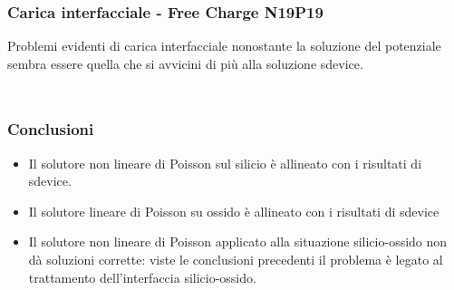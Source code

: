 \begin{frame}
\frametitle{Carica interfacciale - Free Charge N19P19}
Problemi evidenti di carica interfacciale nonostante la soluzione del potenziale sembra essere quella che si avvicini di pi\`u alla soluzione sdevice.
\begin{columns}

\begin{column}{0.3 \textwidth}
\begin{center}
\begin{figure}[!h]
          \end{figure}
\end{center}
\end{column}

\begin{column}{0.3 \textwidth}
\begin{center}
\begin{figure}[!h]
\end{figure}
\end{center}
\end{column}

\begin{column}{0.3 \textwidth}
\begin{center}
\begin{figure}[!h]
\end{figure}
\end{center}
\end{column}

\end{columns}

\end{frame}


\begin{frame}
\frametitle{Conclusioni}
\begin{itemize}
\item[1.] Il solutore non lineare di Poisson sul silicio \`e allineato con i risultati di sdevice.
\item[2.] Il solutore lineare di Poisson su ossido \`e allineato con i risultati di sdevice
\item[3.] Il solutore non lineare di Poisson applicato alla situazione silicio-ossido non d\`a soluzioni corrette: viste le conclusioni precedenti il problema \`e legato al trattamento dell'interfaccia silicio-ossido. 
\end{itemize}
\end{frame}